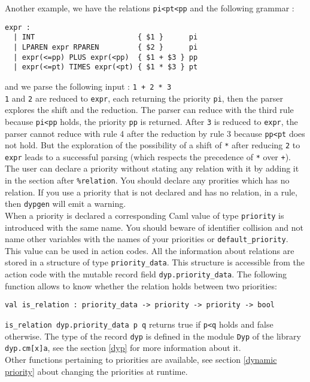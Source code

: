\documentclass[12pt]{article}
\begin{document}
{Another example, we have the relations \texttt{pi<pt<pp} and the following grammar :
\begin{verbatim}
expr :
  | INT                        { $1 }      pi
  | LPAREN expr RPAREN         { $2 }      pi
  | expr(<=pp) PLUS expr(<pp)  { $1 + $3 } pp
  | expr(<=pt) TIMES expr(<pt) { $1 * $3 } pt
\end{verbatim}
and we parse the following input : \texttt{1 + 2 * 3}\\

\texttt{1} and \texttt{2} are reduced to \texttt{expr}, each returning the priority \texttt{pi}, then the parser explores the shift and the reduction.
The parser can reduce with the third rule because \texttt{pi<pp} holds, the priority \texttt{pp} is returned. After \texttt{3} is reduced to \texttt{expr}, the parser cannot reduce with rule 4 after the reduction by rule 3 because \texttt{pp<pt} does not hold.
But the exploration of the possibility of a shift of \texttt{*} after reducing \texttt{2} to \texttt{expr} leads to a successful parsing (which respects the precedence of \texttt{*} over \texttt{+}).\\

The user can declare a priority without stating any relation with it by adding it in the section after \texttt{\%relation}. You should declare any prorities which has no relation. If you use a priority that is not declared and has no relation, in a rule, then \texttt{dypgen} will emit a warning.\\

When a priority is declared a corresponding Caml value of type \texttt{priority} is introduced with the same name. You should beware of identifier collision and not name other variables with the names of your priorities or \texttt{default\_priority}. This value can be used in action codes. All the information about relations are stored in a structure of type \texttt{priority\_data}. This structure is accessible from the action code with the mutable record field \texttt{dyp.priority\_data}. The following function allows to know whether the relation holds between two priorities:
\begin{verbatim}
val is_relation : priority_data -> priority -> priority -> bool
\end{verbatim}
\texttt{is\_relation dyp.priority\_data p q} returns true if \texttt{p<q} holds and false otherwise. The type of the record \verb|dyp| is defined in the module \verb|Dyp| of the library \verb|dyp.cm[x]a|, see the section \ref{dyp} for more information about it.\\
Other functions pertaining to priorities are available, see section \ref{dynamic priority} about changing the priorities at runtime. 

}
\end{document}
